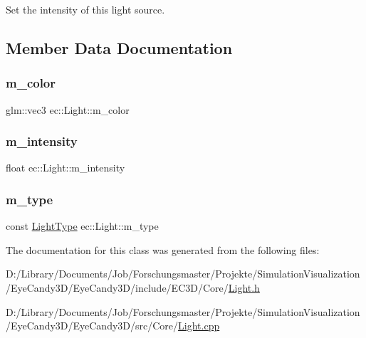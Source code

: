 Set the intensity of this light source. 



\subsection{Member Data Documentation}
\mbox{\label{classec_1_1_light_a7dfc41f1e8f2d7ddad97d60c610c302e}} 
\subsubsection{\texorpdfstring{m\+\_\+color}{m\_color}}
{\footnotesize\ttfamily glm\+::vec3 ec\+::\+Light\+::m\+\_\+color\hspace{0.3cm}{\ttfamily [protected]}}

\mbox{\label{classec_1_1_light_ac655cc4148d5aa4d052bace97770f3b1}} 
\subsubsection{\texorpdfstring{m\+\_\+intensity}{m\_intensity}}
{\footnotesize\ttfamily float ec\+::\+Light\+::m\+\_\+intensity\hspace{0.3cm}{\ttfamily [protected]}}

\mbox{\label{classec_1_1_light_ae3d04075982c6c62e7687b214a504c30}} 
\subsubsection{\texorpdfstring{m\+\_\+type}{m\_type}}
{\footnotesize\ttfamily const \mbox{\hyperlink{namespaceec_a30e2a743ebdeb02ac68a6cfa50f629c7}{Light\+Type}} ec\+::\+Light\+::m\+\_\+type\hspace{0.3cm}{\ttfamily [protected]}}



The documentation for this class was generated from the following files\+:\begin{DoxyCompactItemize}
\item 
D\+:/\+Library/\+Documents/\+Job/\+Forschungsmaster/\+Projekte/\+Simulation\+Visualization/\+Eye\+Candy3\+D/\+Eye\+Candy3\+D/include/\+E\+C3\+D/\+Core/\mbox{\hyperlink{_light_8h}{Light.\+h}}\item 
D\+:/\+Library/\+Documents/\+Job/\+Forschungsmaster/\+Projekte/\+Simulation\+Visualization/\+Eye\+Candy3\+D/\+Eye\+Candy3\+D/src/\+Core/\mbox{\hyperlink{_light_8cpp}{Light.\+cpp}}\end{DoxyCompactItemize}
